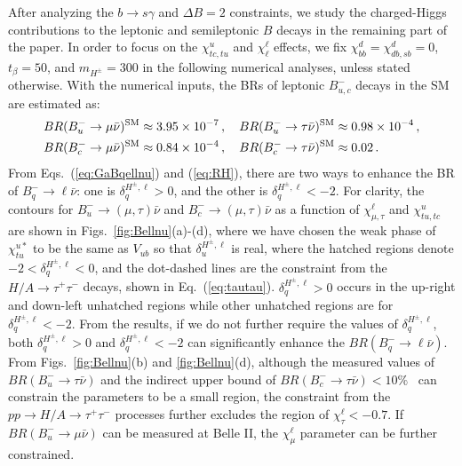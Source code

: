 \documentclass[prd,preprint,superscriptaddress,amsmath,amssymb]{revtex4}
\begin{document}
  After analyzing the $b\to s \gamma$ and $\Delta B=2$ constraints, we study the charged-Higgs contributions to the leptonic and semileptonic $B$ decays in the remaining part of the paper.  In order to focus on the  $\chi^u_{tc, tu}$ and $\chi^\ell_\ell$ effects,  we fix  $\chi^d_{bb}=\chi^d_{db,sb}=0$, $t_\beta=50$, and $m_{H^\pm}=300$ in the following numerical analyses, unless stated otherwise. With the numerical inputs, the BRs of leptonic $B^-_{u,c}$ decays in the SM are estimated as:
  \begin{align}
  BR(B^-_u \to \mu \bar \nu)^{\rm SM} & \approx 3.95 \times 10^{-7}\,, \quad BR(B^-_u \to \tau \bar \nu)^{\rm SM}\approx 0.98 \times 10^{-4}\,, \nonumber \\ 
  BR(B^-_c \to \mu \bar \nu)^{\rm SM} & \approx 0.84 \times 10^{-4}\,, \quad BR(B^-_c \to \tau \bar \nu)^{\rm SM} \approx 0.02\,.
  \end{align}  
  From Eqs.~(\ref{eq:GaBqellnu}) and (\ref{eq:RH}), there are two ways to enhance the BR of $B^-_{q} \to \ell \bar \nu$: one is $\delta^{H^\pm,\ell}_q >0$, and the other is $\delta^{H^\pm,\ell}_{q} < -2 $. For clarity, the contours for $B^-_u \to (\mu, \tau) \bar \nu$ and $B^-_c \to (\mu, \tau) \bar\nu$ as a function of $\chi^\ell_{\mu ,\tau}$ and $\chi^u_{tu,tc}$ are shown in Figs.~\ref{fig:Bellnu}(a)-(d), where we have chosen the weak phase of $\chi^{u*}_{tu}$ to be the same as $V_{ub}$ so that $\delta^{H^\pm,\ell}_u$ is  real, where  the  hatched regions denote $-2 < \delta^{H^\pm, \ell}_{q} < 0$,  and the dot-dashed lines are the constraint from the $H/A\to \tau^+ \tau^-$ decays, shown in Eq.~(\ref{eq:tautau}). $\delta^{H^\pm, \ell}_{q}>0$ occurs in the up-right and down-left unhatched regions while other unhatched regions are for $\delta^{H^\pm, \ell}_{q}< -2$. From the results,  if we do not further require the values of $\delta^{H^\pm,\ell}_q$, both  $\delta^{H^\pm,\ell}_q >0$ and $\delta^{H^\pm,\ell}_q< -2$ can significantly enhance the $BR(B^-_q \to \ell \bar \nu)$. From Figs.~\ref{fig:Bellnu}(b) and \ref{fig:Bellnu}(d), although the measured values of  $BR(B^-_u \to \tau \bar\nu)$ and  the indirect upper bound of $BR(B^-_c \to \tau \bar\nu)< 10\%$~\cite{Akeroyd:2017mhr} can constrain the parameters to be a small region, the constraint from the $pp\to H/A\to \tau^+\tau^-$ processes further excludes the region of $\chi^\ell_\tau < -0.7$.  If $BR(B^-_u \to \mu \bar\nu)$ can be measured at Belle II, the $\chi^\ell_\mu$ parameter can be further constrained. 
  
\end{document}
